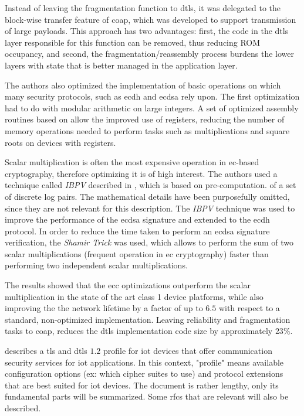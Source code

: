 \documentclass{llncs}
\begin{document}
{Instead of leaving the fragmentation function to \gls{dtls}, it was
delegated to the block-wise transfer feature of \gls{coap}\cite{RFC7959}, which was developed
to support transmission of large payloads. This approach has two advantages: first, the code in the \gls{dtls}
layer responsible for this function can be removed, thus reducing ROM occupancy,
and second, the fragmentation/reassembly process burdens the lower layers
with state that is better managed in the application layer.

The authors also optimized the implementation of basic operations on which
many security protocols, such as \gls{ecdh} and \gls{ecdsa} rely upon. The first
optimization had to do with modular arithmetic on large integers. A set of optimized
assembly routines based on \cite{Comparin25:Online} allow the improved use of
registers, reducing the number of memory operations needed to perform
tasks such as multiplications and square roots on devices with  registers.

Scalar multiplication is often the most expensive operation in \gls{ec}-based
cryptography, therefore optimizing it is of high interest. The authors used a
technique called \textit{IBPV} described in \cite{LowcostS87:online}, which is based on pre-computation.
of a set of discrete log pairs. The mathematical details have been purposefully omitted,
since they are not relevant for this description. The \textit{IBPV} technique was used
to improve the performance of the \gls{ecdsa} signature and extended to the
\gls{ecdh} protocol. In order to reduce the time taken to perform an \gls{ecdsa}
signature verification, the \textit{Shamir Trick} was used, which allows
to perform the sum of two scalar multiplications (frequent operation in \gls{ec} cryptography)
faster than performing two independent scalar multiplications.

The results showed that the \gls{ecc} optimizations
outperform the scalar multiplication in the state of the art class 1 device platforms,
while also improving the the network lifetime by a factor of up to $6.5$ with
respect to a standard, non-optimized implementation. Leaving reliability and
fragmentation tasks to \gls{coap}, reduces the \gls{dtls} implementation code size
by approximately $23\%$.

\cite{RFC7925} describes a \gls{tls} and \gls{dtls} $1.2$
profile for \gls{iot} devices that offer communication security services
for \gls{iot} applications.
In this context, "profile" means available configuration options (ex: which
cipher suites to use) and protocol extensions that are best suited for \gls{iot} devices.
The document is rather lengthy, only its fundamental parts will be summarized. Some \gls{rfc}s that are relevant will also be described.

}
\end{document}
